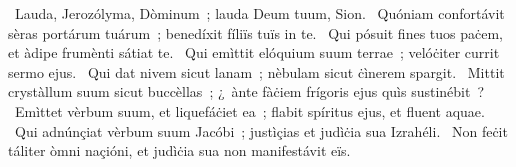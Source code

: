 \psalmChapterWithInscription{}
{ }
{%
~Lauda, Jerozólyma, Dòminum~; lauda Deum tuum, Sion. 
~Quóniam confortávit sèras portárum tuárum~; benedíxit fíliïs tuïs in te. 
~Qui pósuit fines tuos paċem, et àdipe frumènti sátiat te. 
~Qui emìttit elóquium suum terrae~; velóċiter currit sermo ejus. 
~Qui dat nivem sicut lanam~; nèbulam sicut ċìnerem spargit. 
~Mittit crystàllum suum sicut buccèllas~; ¿~ànte fàċiem frígoris ejus quìs sustinébit~? 
~Emìttet vèrbum suum, et liquefáċiet ea~; flabit spíritus ejus, et fluent aquae. 
~Qui adnúnçiat vèrbum suum Jacóbi~; justìçias et judìċia sua Izrahéli. 
~Non feċit táliter òmni naçióni, et judìċia sua non manifestávit eïs. 
}
